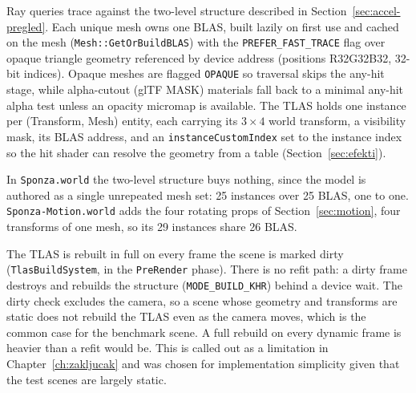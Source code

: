 Ray queries trace against the two-level structure described in Section~\ref{sec:accel-pregled}. Each
unique mesh owns one BLAS, built lazily on first use and cached on the mesh
(\texttt{Mesh::GetOrBuildBLAS}) with the \texttt{PREFER_FAST_TRACE} flag over opaque triangle
geometry referenced by device address (positions R32G32B32, 32-bit indices). Opaque meshes are
flagged \texttt{OPAQUE} so traversal skips the any-hit stage, while alpha-cutout (glTF MASK) materials
fall back to a minimal any-hit alpha test unless an opacity micromap is available. The TLAS holds one
instance per (Transform, Mesh) entity, each carrying its $3\times4$ world transform, a visibility
mask, its BLAS address, and an \texttt{instanceCustomIndex} set to the instance index so the hit
shader can resolve the geometry from a table (Section~\ref{sec:efekti}).

In \texttt{Sponza.world} the two-level structure buys nothing, since the model is authored as a
single unrepeated mesh set: 25 instances over 25 BLAS, one to one.
\texttt{Sponza-Motion.world} adds the four rotating props of Section~\ref{sec:motion}, four
transforms of one mesh, so its 29 instances share 26 BLAS.

The TLAS is rebuilt in full on every frame the scene is marked dirty (\texttt{TlasBuildSystem}, in
the \texttt{PreRender} phase). There is no refit path: a dirty frame destroys and rebuilds the
structure (\texttt{MODE_BUILD_KHR}) behind a device wait. The dirty check excludes the camera, so a
scene whose geometry and transforms are static does not rebuild the TLAS even as the camera moves,
which is the common case for the benchmark scene. A full rebuild on every dynamic frame is heavier
than a refit would be. This is called out as a limitation in Chapter~\ref{ch:zakljucak} and was
chosen for implementation simplicity given that the test scenes are largely static.

